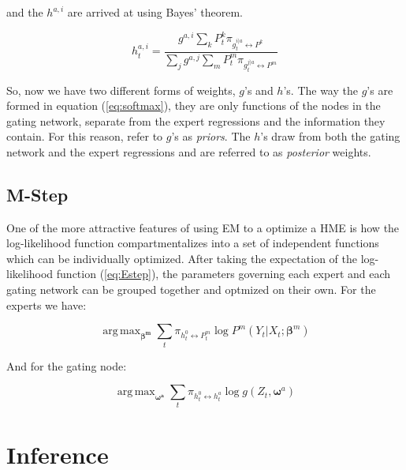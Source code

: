 \documentclass[12pt]{article}
\newcommand{\gateprod}[2]{\pi_{#1 \longleftrightarrow #2}}
\newcommand{\shortsum}[1]{\sum \nolimits_{#1}}
\newcommand{\h}[2]{h^{#1}_{#2}}
\DeclareMathOperator*{\argmax}{arg\,max}
\begin{document}
and the $h^{a, i}$ are arrived at using Bayes' theorem.

\begin{equation} \label{eq:posteriornode}
  \h{a,i}{t} = \frac{g^{a, i} \shortsum{k} P^{k}_{t} \gateprod{g^{i|a}_{t}}{P^{k}}}{\shortsum{j} g^{a, j} \shortsum{m} P^{m}_{t} \gateprod{g^{j|a}_{t}}{P^{m}}}
\end{equation}


So, now we have two different forms of weights, $g$'s and $h$'s. The
way the $g$'s are formed in equation (\ref{eq:softmax}), they are only
functions of the nodes in the gating network, separate from the
expert regressions and the information they contain. For this reason,
\cite{JordanJacobs1993} refer to $g$'s as \textit{priors}.
The $h$'s draw from both the gating network and the expert regressions and
are referred to as \textit{posterior} weights.


\subsection{M-Step}

One of the more attractive features of using EM to a optimize a
HME is how the log-likelihood function compartmentalizes into a set 
of independent functions which can be individually optimized. After
taking the expectation of the log-likelihood function (\ref{eq:Estep}), the
parameters governing each expert and each gating network can be grouped
together and optmized on their own. For the experts we have:

\begin{equation}
  \argmax_{\boldsymbol{\beta^{m}}} \sum_{t} \gateprod{h^{0}_{t}}{P^{m}_{t}} \log P^{m} (Y_{t}|X_{t}; \boldsymbol{\beta}^{m})
\end{equation}

And for the gating node:

\begin{equation}
  \argmax_{\boldsymbol{\omega^{a}}} \sum_{t} \gateprod{h^{0}_{t}}{h^{a}_{t}} \log g(Z_{t}, \boldsymbol{\omega}^{a})
\end{equation}



\section{Inference} \label{sec:Inference}
\end{document}
